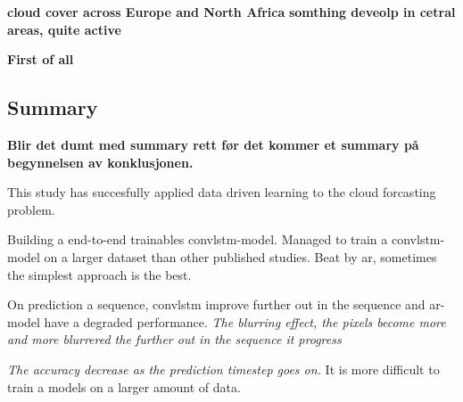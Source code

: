 \textbf{cloud cover across Europe and North Africa}
\textbf{somthing deveolp in cetral areas, quite active}

\textbf{First of all}

\subsection{Summary} \label{sec:summary_num}
\textbf{Blir det dumt med summary rett før det kommer et summary på begynnelsen av konklusjonen.}

This study has succesfully applied data driven learning to the cloud forcasting problem. 

Building a end-to-end trainables \acrshort{convlstm}-model. Managed to train a \acrshort{convlstm}-model on a larger dataset than other published studies. Beat by \acrshort{ar}, sometimes the simplest approach is the best. 

On prediction a sequence, \acrshort{convlstm} improve further out in the sequence and \acrshort{ar}-model have a degraded performance.
\textit{The blurring effect, the pixels become more and more blurrered the further out in the sequence it progress}

\textit{The accuracy decrease as the prediction timestep goes on.}
It is more difficult to train a models on a larger amount of data. 
